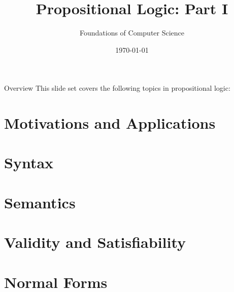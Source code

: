 \documentclass[style=sailor,size=12pt]{powerdot}
\title{Propositional Logic: Part I}
\author{Foundations of Computer Science}
\date{\today}
\begin{document}
\maketitle
\begin{slide}[toc=,bm=]{Overview}
This slide set covers the following topics in propositional logic:

\vspace{5mm}
\tableofcontents[content=sections]
\end{slide}

\section[slide=true]{Motivations and Applications}


\section[slide=true]{Syntax}


\section[slide=true]{Semantics}


\section[slide=true]{Validity and Satisfiability}


\section[slide=true]{Normal Forms}

\end{document}
